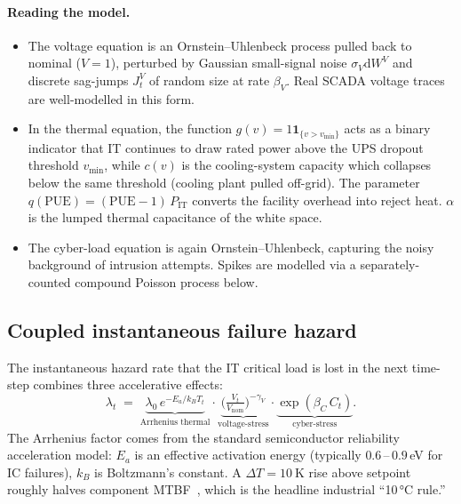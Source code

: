 \documentclass[11pt,a4paper]{article}
\theoremstyle{ia}
\newcommand{\1}{\mathbf{1}}
\newcommand{\dd}{\mathrm{d}}
\begin{document}
\paragraph{Reading the model.}
\begin{itemize}[leftmargin=*,nosep]
  \item The voltage equation is an Ornstein--Uhlenbeck process pulled
        back to nominal ($V=1$), perturbed by Gaussian small-signal noise
        $\sigma_V \dd W^V$ and discrete sag-jumps $J^V_t$ of random size at
        rate $\beta_V$. Real SCADA voltage traces are well-modelled in
        this form.
  \item In the thermal equation, the function
        $g(v)=1\!\!\1_{\{v>v_{\min}\}}$ acts as a binary indicator that
        IT continues to draw rated power above the UPS dropout
        threshold $v_{\min}$, while $c(v)$ is the cooling-system
        capacity which collapses below the same threshold (cooling
        plant pulled off-grid).
        The parameter $q(\mathrm{PUE})=(\mathrm{PUE}-1)\,P_{\mathrm{IT}}$
        converts the facility overhead into reject heat. $\alpha$ is
        the lumped thermal capacitance of the white space.
  \item The cyber-load equation is again Ornstein--Uhlenbeck, capturing
        the noisy background of intrusion attempts. Spikes are
        modelled via a separately-counted compound Poisson process below.
\end{itemize}

\subsection{Coupled instantaneous failure hazard}

The instantaneous hazard rate that the IT critical load is lost in
the next time-step combines three accelerative effects:
\begin{equation}\label{eq:hazard}
   \boxed{\;
   \lambda_t \;=\; \underbrace{\lambda_0\, e^{-E_a/k_B T_t}}_{\text{Arrhenius thermal}}
   \cdot \underbrace{\bigl(\tfrac{V_t}{V_{\mathrm{nom}}}\bigr)^{-\gamma_V}}_{\text{voltage-stress}}
   \cdot \underbrace{\exp(\beta_C\,C_t)}_{\text{cyber-stress}} .\;}
\end{equation}
The Arrhenius factor comes from the standard semiconductor reliability
acceleration model: $E_a$ is an effective activation energy (typically
$0.6\,$--$\,0.9$\,eV for IC failures), $k_B$ is Boltzmann's constant.
A $\Delta T=\SI{10}{\kelvin}$ rise above setpoint roughly halves
component MTBF~\citep{Black1969}, which is the headline industrial
``10\,°C rule.''
\end{document}
